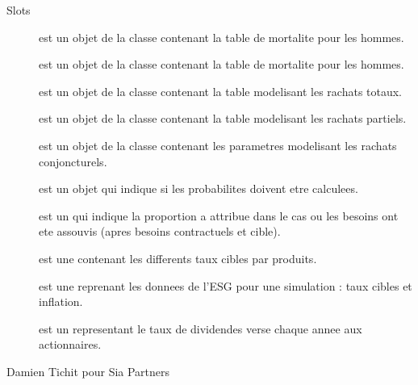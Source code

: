 \documentclass[a4paper]{book}
\begin{document}
\begin{Section}{Slots}

\begin{description}

\item[] est un objet de la classe  contenant la table de mortalite pour les hommes.

\item[] est un objet de la classe  contenant la table de mortalite pour les hommes.

\item[] est un objet de la classe  contenant la table modelisant les rachats totaux.

\item[] est un objet de la classe  contenant la table modelisant les rachats partiels.

\item[] est un objet de la classe  contenant les parametres modelisant les rachats conjoncturels.

\item[] est un objet  qui indique si les probabilites doivent etre calculees.

\item[] est un  qui indique la proportion a attribue dans le cas ou les besoins ont ete assouvis (apres besoins contractuels et cible).

\item[] est une  contenant les differents taux cibles par produits.

\item[] est une  reprenant les donnees de l'ESG pour une simulation : taux cibles et inflation.

\item[] est un  representant le taux de dividendes verse chaque annee aux actionnaires.

\end{description}
\end{Section}
%
\begin{Author}\relax
Damien Tichit pour Sia Partners
\end{Author}
\end{document}
